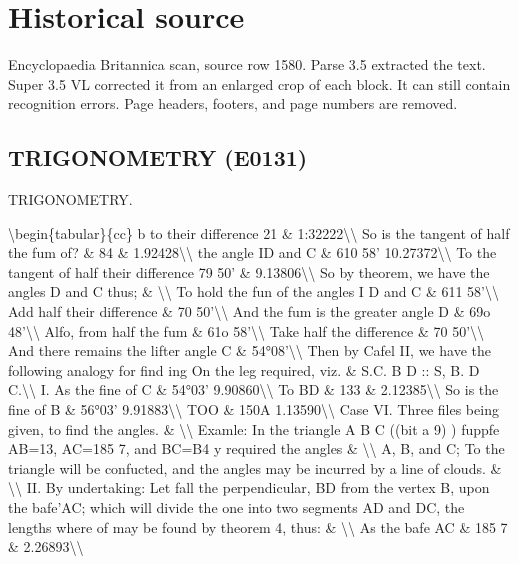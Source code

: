 \documentclass{article}
\begin{document}
\section*{Historical source}
Encyclopaedia Britannica scan, source row 1580. Parse 3.5 extracted the text. Super 3.5 VL corrected it from an enlarged crop of each block. It can still contain recognition errors.
Page headers, footers, and page numbers are removed.

\subsection*{TRIGONOMETRY (E0131)}
TRIGONOMETRY.

\textbackslash{}begin\{tabular\}\{cc\}
b to their difference 21 \& 1:32222\textbackslash{}\textbackslash{}
So is the tangent of half the fum of? \& 84 \& 1.92428\textbackslash{}\textbackslash{}
the angle ID and C \& 610 58' 10.27372\textbackslash{}\textbackslash{}
To the tangent of half their difference 79 50' \& 9.13806\textbackslash{}\textbackslash{}
So by theorem, we have the angles D and C thus; \& \textbackslash{}\textbackslash{}
To hold the fun of the angles I D and C \& 611 58'\textbackslash{}\textbackslash{}
Add half their difference \& 70 50'\textbackslash{}\textbackslash{}
And the fum is the greater angle D \& 69o 48'\textbackslash{}\textbackslash{}
Alfo, from half the fum \& 61o 58'\textbackslash{}\textbackslash{}
Take half the difference \& 70 50'\textbackslash{}\textbackslash{}
And there remains the lifter angle C \& 54°08'\textbackslash{}\textbackslash{}
Then by Cafel II, we have the following analogy for find ing On the leg required, viz. \& S.C. B D :: S, B. D C.\textbackslash{}\textbackslash{}
I. As the fine of C \& 54°03' 9.90860\textbackslash{}\textbackslash{}
To BD \& 133 \& 2.12385\textbackslash{}\textbackslash{}
So is the fine of B \& 56°03' 9.91883\textbackslash{}\textbackslash{}
TOO \& 150A 1.13590\textbackslash{}\textbackslash{}
Case VI. Three files being given, to find the angles. \& \textbackslash{}\textbackslash{}
Examle: In the triangle A B C ((bit a 9) ) fuppfe AB=13, AC=185 7, and BC=B4 y required the angles \& \textbackslash{}\textbackslash{}
A, B, and C; To the triangle will be confucted, and the angles may be incurred by a line of clouds. \& \textbackslash{}\textbackslash{}
II. By undertaking: Let fall the perpendicular, BD from the vertex B, upon the bafe’AC; which will divide the one into two segments AD and DC, the lengths where of may be found by theorem 4, thus: \& \textbackslash{}\textbackslash{}
As the bafe AC \& 185 7 \& 2.26893\textbackslash{}\textbackslash{}
\end{document}
